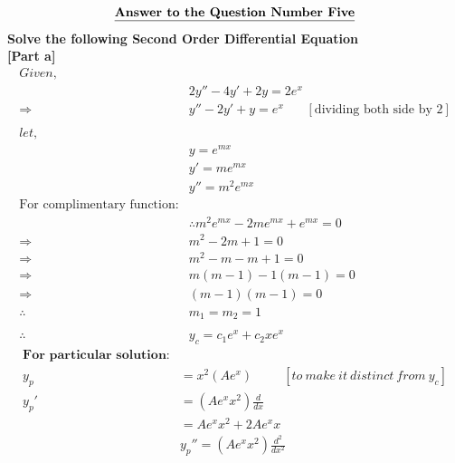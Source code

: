 \documentclass{article}
\begin{document}

                
\begin{homeworkProblem}
    \[ \textbf{\underline {Answer to the Question Number Five}}
    \]
    \textbf{ Solve the following Second Order Differential Equation}
    \\
    \textbf{[Part a]}
    \\
    \[
    \begin{split}
    Given, 
    \\
    &{2y}'' - {4y}' + 2y = 2e^{x}
    \\
    \Rightarrow &{y}'' - {2y}' + y = e^x \ \ \ \ \ \ \ \ [\text{dividing both side by 2}]
    \\ \\
    let,
    \\
    &y = e^{mx}
    \\
    &y' = m e^{mx}
    \\
    &{y}'' = m^2 e^{mx}
    \\
    \text{For complimentary function:}
    \\
    &\therefore m^2 e^{mx} - 2me^{mx} + e^{mx} = 0
    \\
    \Rightarrow & m^2 - 2m + 1 = 0\\
    \Rightarrow & m^2 - m -m + 1 = 0\\
    \Rightarrow & m(m-1) - 1(m-1) = 0\\
    \Rightarrow & (m-1)(m-1) = 0\\
    \therefore  \ & m_1 = m_2 = 1\\
    \\
    \therefore \ & y_c = c_1 e^x + c_2 x e^x
    \end{split}
    \]
    \pagebreak
    \[
    \begin{split}
        \textbf{For particular solution:}\\
        y_p &= x^2 (A e^x) \ \ \ \ \ \ \ \ \ \ \ [to \ make \ it \ distinct \ from \ y_c]
        \\
        {y_p}' &= (A e^x x^2) \frac{d}{dx}
        \\
        &= A e^x x^2 + 2 A e^x x
        \\[5mm]
        & {y_p}'' = (A e^x x^2) \frac{d^2}{dx^2}
        \\

\end{split}\]
\end{homeworkProblem}
\end{document}
